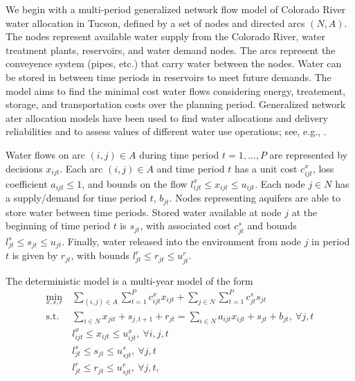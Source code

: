 \documentclass{iserc}
\newcommand{\st}{\mbox{s.t.}}
\begin{document}
We begin with a multi-period generalized network flow model of Colorado River water allocation in Tucson, defined by a set of nodes and directed arcs $(N,A)$.
The nodes represent available water supply from the Colorado River, water treatment plants, reservoirs, and water demand nodes.
The arcs represent the conveyence system (pipes, etc.) that carry water between the nodes. 
Water can be stored in between time periods in reservoirs to meet future demands. 
The model aims to find the minimal cost water flows considering energy, treatement, storage, and transportation costs over the planning period. 
Generalized network ater allocation models have been used to find water allocations and delivery reliabilities and to assess values of different water use operations; see, e.g., \cite{draper_etal_03}. 

Water flows on arc $(i,j) \in A$ during time period $t = 1, \dots, P$ are represented by decisions $x_{ijt}$.
Each arc $(i,j) \in A$ and time period $t$ has a unit cost $c_{ijt}^x$, loss coefficient $a_{ijt} \leq 1$, and bounds on the flow $l_{ijt}^x \leq x_{ijt} \leq u_{ijt}$.
Each node $j \in N$ has a supply/demand for time period $t$, $b_{jt}$.
Nodes representing aquifers are able to store water between time periods.
Stored water available at node $j$ at the beginning of time period $t$ is $s_{jt}$, with associated cost $c_{jt}^s$ and bounds $l_{jt}^s \leq s_{jt} \leq u_{jt}$.
Finally, water released into the environment from node $j$ in period $t$ is given by $r_{jt}$, with bounds $l_{jt}^r \leq r_{jt} \leq u_{jt}^r$.

The deterministic model is a multi-year model of the form
\begin{align*}
	\min_{x,s,r} \ & \sum_{(i,j) \in A} \sum_{t=1}^P c_{ijt}^x x_{ijt} + \sum_{j \in N} \sum_{t=1}^P c_{jt}^s s_{jt}\\
	\st \ & \sum_{i \in N} x_{jit} + s_{j,t+1} + r_{jt} = \sum_{i \in N} a_{ijt} x_{ijt} + s_{jt} + b_{jt}, \ \forall j,t \\
	& l_{ijt}^x \leq x_{ijt} \leq u_{ijt}^x, \ \forall i,j,t \\
	& l_{jt}^s \leq s_{jt} \leq u_{sjt}^s, \ \forall j,t \\
	& l_{jt}^r \leq r_{jt} \leq u_{sjt}^r, \ \forall j,t,
\end{align*}
\end{document}

